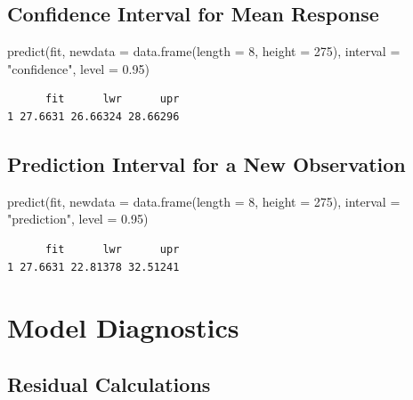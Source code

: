 \documentclass[
  letterpaper,
]{scrbook}
\newenvironment{Shaded}{\begin{snugshade}}{\end{snugshade}}
\newcommand{\AttributeTok}[1]{\textcolor[rgb]{0.40,0.45,0.13}{#1}}
\newcommand{\DecValTok}[1]{\textcolor[rgb]{0.68,0.00,0.00}{#1}}
\newcommand{\FloatTok}[1]{\textcolor[rgb]{0.68,0.00,0.00}{#1}}
\newcommand{\FunctionTok}[1]{\textcolor[rgb]{0.28,0.35,0.67}{#1}}
\newcommand{\NormalTok}[1]{\textcolor[rgb]{0.00,0.23,0.31}{#1}}
\newcommand{\StringTok}[1]{\textcolor[rgb]{0.13,0.47,0.30}{#1}}
\begin{document}
\subsection{Confidence Interval for Mean
Response}\label{confidence-interval-for-mean-response}

\begin{Shaded}
\begin{Highlighting}[]
\FunctionTok{predict}\NormalTok{(fit, }\AttributeTok{newdata =} \FunctionTok{data.frame}\NormalTok{(}\AttributeTok{length =} \DecValTok{8}\NormalTok{, }\AttributeTok{height =} \DecValTok{275}\NormalTok{),}
        \AttributeTok{interval =} \StringTok{"confidence"}\NormalTok{, }\AttributeTok{level =} \FloatTok{0.95}\NormalTok{)}
\end{Highlighting}
\end{Shaded}

\begin{verbatim}
      fit      lwr      upr
1 27.6631 26.66324 28.66296
\end{verbatim}

\subsection{Prediction Interval for a New
Observation}\label{prediction-interval-for-a-new-observation}

\begin{Shaded}
\begin{Highlighting}[]
\FunctionTok{predict}\NormalTok{(fit, }\AttributeTok{newdata =} \FunctionTok{data.frame}\NormalTok{(}\AttributeTok{length =} \DecValTok{8}\NormalTok{, }\AttributeTok{height =} \DecValTok{275}\NormalTok{),}
        \AttributeTok{interval =} \StringTok{"prediction"}\NormalTok{, }\AttributeTok{level =} \FloatTok{0.95}\NormalTok{)}
\end{Highlighting}
\end{Shaded}

\begin{verbatim}
      fit      lwr      upr
1 27.6631 22.81378 32.51241
\end{verbatim}

\section{Model Diagnostics}\label{model-diagnostics}

\subsection{Residual Calculations}\label{residual-calculations}
\end{document}
